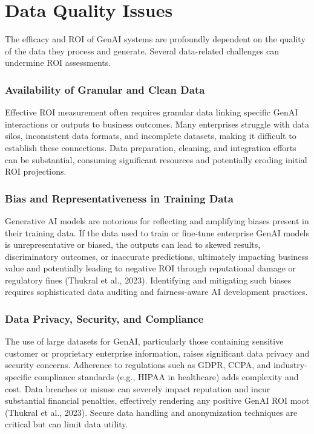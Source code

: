 \documentclass[10pt,journal,compsoc,twocolumn]{IEEEtran}
\begin{document}
\section{Data Quality Issues}


The efficacy and ROI of GenAI systems are profoundly dependent on the quality of the data they process and generate. Several data-related challenges can undermine ROI assessments.


\subsubsection{Availability of Granular and Clean Data}

Effective ROI measurement often requires granular data linking specific GenAI interactions or outputs to business outcomes. Many enterprises struggle with data silos, inconsistent data formats, and incomplete datasets, making it difficult to establish these connections. Data preparation, cleaning, and integration efforts can be substantial, consuming significant resources and potentially eroding initial ROI projections.


\subsubsection{Bias and Representativeness in Training Data}

Generative AI models are notorious for reflecting and amplifying biases present in their training data. If the data used to train or fine-tune enterprise GenAI models is unrepresentative or biased, the outputs can lead to skewed results, discriminatory outcomes, or inaccurate predictions, ultimately impacting business value and potentially leading to negative ROI through reputational damage or regulatory fines (Thukral et al., 2023). Identifying and mitigating such biases requires sophisticated data auditing and fairness-aware AI development practices.


\subsubsection{Data Privacy, Security, and Compliance}

The use of large datasets for GenAI, particularly those containing sensitive customer or proprietary enterprise information, raises significant data privacy and security concerns. Adherence to regulations such as GDPR, CCPA, and industry-specific compliance standards (e.g., HIPAA in healthcare) adds complexity and cost. Data breaches or misuse can severely impact reputation and incur substantial financial penalties, effectively rendering any positive GenAI ROI moot (Thukral et al., 2023). Secure data handling and anonymization techniques are critical but can limit data utility.
\end{document}
